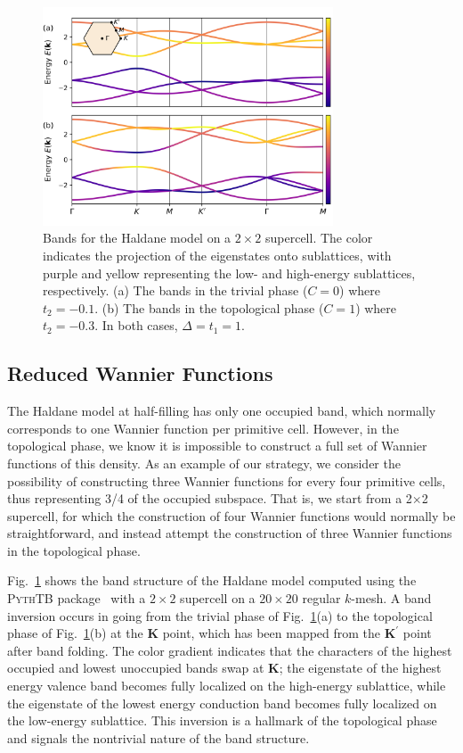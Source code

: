 \documentclass[galley,aps,pra,10pt,amsmath,amssymb,
    superscriptaddress,nofootinbib,longbibliography]{revtex4-2}
\newcounter{comm}
\newcommand{\code}[1]{\textsc{#1}}
\begin{document}
\begin{figure}[t!]
\begin{center}
\includegraphics[width=3.4in]{fig1.png}
\end{center}
\vspace{-10mm}
\caption{Bands for the Haldane model on a $2\times 2$ supercell. The color indicates the projection of the eigenstates onto sublattices, with purple and yellow representing the low- and high-energy sublattices, respectively. (a) The bands in the trivial phase ($C=0$) where $t_2 = -0.1$. (b) The bands in the topological phase ($C=1$) where $t_2 = -0.3$. In both cases, $\Delta = t_1 = 1$.}
\label{FIG1}
\end{figure}



\subsection{Reduced Wannier Functions}
\label{ss:dfcntWF} 


 The Haldane model at half-filling has only one occupied band, which normally corresponds to one Wannier function per primitive cell. However, in the topological phase, we know it is impossible to construct a full set of Wannier functions of this density. As an example of our strategy, we consider the possibility of constructing three Wannier functions for every four primitive cells, thus representing 3/4 of the occupied subspace. That is, we start from a 2$\times$2 supercell, for which the construction of four Wannier functions would normally be straightforward, and instead attempt the construction of three Wannier functions in the topological phase.

Fig.~\ref{FIG1} shows the band structure of the Haldane model computed using the \code{PythTB} package~\cite{pythtb} with a $2\times 2$ supercell on a $20\times 20$ regular $k$-mesh. A band inversion occurs in going from the trivial phase of Fig.~\ref{FIG1}(a) to the topological phase of Fig.~\ref{FIG1}(b) at the $\mathbf{K}$ point, which has been mapped from the $\mathbf{K}^{\prime}$ point after band folding. The color gradient indicates that the characters of the highest occupied and lowest unoccupied bands swap at $\mathbf{K}$; the eigenstate of the highest energy valence band becomes fully localized on the high-energy sublattice, while the eigenstate of the lowest energy conduction band becomes fully localized on the low-energy sublattice. This inversion is a hallmark of the topological phase and signals the nontrivial nature of the band structure.
\end{document}

